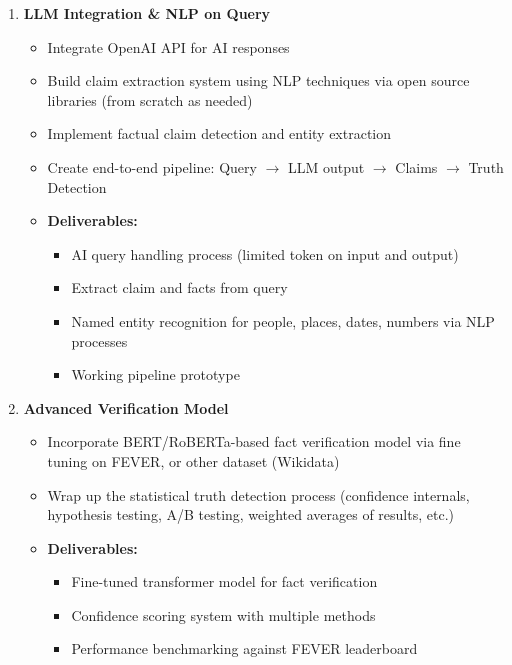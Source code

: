 \documentclass[11pt,letterpaper]{article}
\begin{document}
{\begin{enumerate}[label=\textbf{Week \arabic*:}]
    \item \textbf{LLM Integration \& NLP on Query}
    \begin{itemize}[label=$\bullet$]
        \item Integrate OpenAI API for AI responses
        \item Build claim extraction system using NLP techniques via open source libraries (from scratch as needed)
        \item Implement factual claim detection and entity extraction
        \item Create end-to-end pipeline: Query $\rightarrow$ LLM output $\rightarrow$ Claims $\rightarrow$ Truth Detection
        \item \textbf{Deliverables:}
        \begin{itemize}[label=$\square$]
            \item AI query handling process (limited token on input and output)
            \item  Extract claim and facts from query
            \item Named entity recognition for people, places, dates, numbers via NLP processes
            \item Working pipeline prototype
        \end{itemize}
    \end{itemize}

    \item \textbf{Advanced Verification Model}
    \begin{itemize}[label=$\bullet$]
        \item Incorporate BERT/RoBERTa-based fact verification model via fine tuning on FEVER, or other dataset (Wikidata)
        \item Wrap up the statistical truth detection process (confidence internals, hypothesis testing, A/B testing, weighted averages of results, etc.)
        \item \textbf{Deliverables:}
        \begin{itemize}[label=$\square$]
            \item Fine-tuned transformer model for fact verification
            \item Confidence scoring system with multiple methods
            \item Performance benchmarking against FEVER leaderboard
        \end{itemize}
    \end{itemize}


\end{enumerate}}
\end{document}
